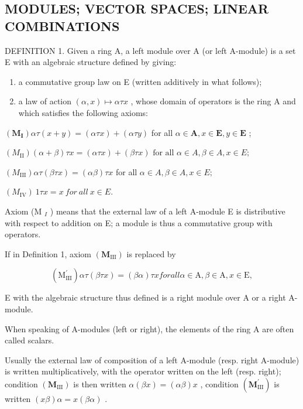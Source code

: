\subsection{MODULES; VECTOR SPACES; LINEAR COMBINATIONS}

DEFINITION 1. Given a ring A, a left module over A (or left A-module) is a set E with an algebraic structure defined by giving:

\begin{enumerate}
\def\labelenumi{(\arabic{enumi})}
\item
  a commutative group law on E (written additively in what follows);
\item
  a law of action \((\alpha, x) \mapsto \alpha \tau x\) , whose domain of operators is the ring A and which satisfies the following axioms:
\end{enumerate}

\((\mathbf{M}_{\mathbf{I}})\alpha \tau (x + y) = (\alpha \tau x) + (\alpha \tau y)\) for all \(\alpha \in \mathbf{A}, x \in \mathbf{E}, y \in \mathbf{E}\) ;

\((M_{\mathrm{II}}) (\alpha + \beta) \tau x = (\alpha \tau x) + (\beta \tau x) \text{ for all } \alpha \in A, \beta \in A, x \in E;\)

\((M_{\mathrm{III}})\alpha \tau (\beta \tau x) = (\alpha \beta)\tau x\) for all \(\alpha \in A,\beta \in A,x\in E;\)

\((M_{\mathrm{IV}}) \ 1 \tau x = x \ for \ all \ x \in E.\)

Axiom (M \(_{I}\) ) means that the external law of a left A-module E is distributive with respect to addition on E; a module is thus a commutative group with operators.

If in Definition 1, axiom \((\mathbf{M}_{\mathrm{III}})\) is replaced by

\[
\left(\mathrm{M} _ {\mathrm{III}} ^ {\prime}\right) \alpha \tau (\beta \tau x) = (\beta \alpha) \tau x for all \alpha \in \mathrm{A}, \beta \in \mathrm{A}, x \in \mathrm{E},
\]

E with the algebraic structure thus defined is a right module over A or a right A-module.

When speaking of A-modules (left or right), the elements of the ring A are often called scalars.

Usually the external law of composition of a left A-module (resp. right A-module) is written multiplicatively, with the operator written on the left (resp. right); condition \((\mathbf{M}_{\mathrm{III}})\) is then written \(\alpha(\beta x) = (\alpha\beta)x\) , condition \((\mathbf{M}_{\mathrm{III}}^{\prime})\) is written \((x\beta)\alpha = x(\beta\alpha)\) .

